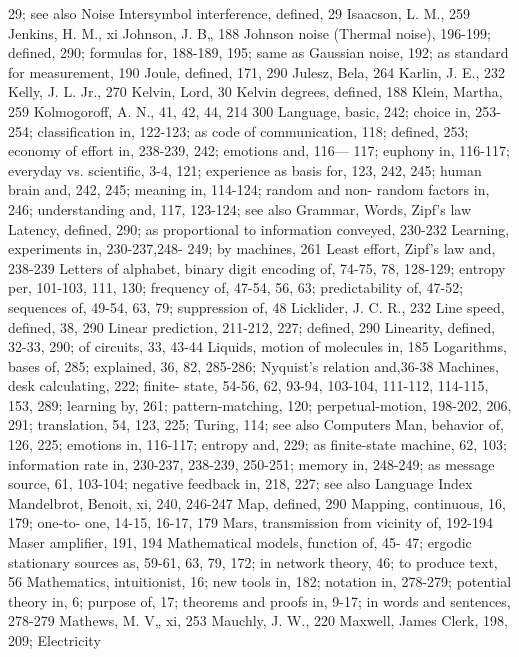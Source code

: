 {{{{{{{{{{{{{{{29; see also Noise
Intersymbol interference, defined, 29
Isaacson, L. M., 259
Jenkins, H. M., xi
Johnson, J. B„ 188
Johnson noise (Thermal noise), 196-199;
defined, 290; formulas for, 188-189,
195; same as Gaussian noise, 192;
as standard for measurement, 190
Joule, defined, 171, 290
Julesz, Bela, 264
Karlin, J. E., 232
Kelly, J. L. Jr., 270
Kelvin, Lord, 30
Kelvin degrees, defined, 188
Klein, Martha, 259
Kolmogoroff, A. N., 41, 42, 44, 214
300
Language, basic, 242; choice in, 253-
254; classification in, 122-123; as
code of communication, 118; defined,
253; economy of effort in,
238-239, 242; emotions and, 116—
117; euphony in, 116-117; everyday
vs. scientific, 3-4, 121; experience
as basis for, 123, 242, 245;
human brain and, 242, 245; meaning
in, 114-124; random and non-
random factors in, 246; understanding
and, 117, 123-124; see also
Grammar, Words, Zipf’s law
Latency, defined, 290; as proportional
to information conveyed, 230-232
Learning, experiments in, 230-237,248-
249; by machines, 261
Least effort, Zipf’s law and, 238-239
Letters of alphabet, binary digit encoding
of, 74-75, 78, 128-129; entropy
per, 101-103, 111, 130; frequency
of, 47-54, 56, 63; predictability of,
47-52; sequences of, 49-54, 63, 79;
suppression of, 48
Licklider, J. C. R., 232
Line speed, defined, 38, 290
Linear prediction, 211-212, 227; defined,
290
Linearity, defined, 32-33, 290; of circuits,
33, 43-44
Liquids, motion of molecules in, 185
Logarithms, bases of, 285; explained,
36, 82, 285-286; Nyquist’s relation
and,36-38
Machines, desk calculating, 222; finite-
state, 54-56, 62, 93-94, 103-104,
111-112, 114-115, 153, 289; learning
by, 261; pattern-matching, 120;
perpetual-motion, 198-202, 206,
291; translation, 54, 123, 225; Turing,
114; see also Computers
Man, behavior of, 126, 225; emotions
in, 116-117; entropy and, 229; as
finite-state machine, 62, 103; information
rate in, 230-237, 238-239,
250-251; memory in, 248-249; as
message source, 61, 103-104; negative
feedback in, 218, 227; see also
Language
Index
Mandelbrot, Benoit, xi, 240, 246-247
Map, defined, 290
Mapping, continuous, 16, 179; one-to-
one, 14-15, 16-17, 179
Mars, transmission from vicinity of,
192-194
Maser amplifier, 191, 194
Mathematical models, function of, 45-
47; ergodic stationary sources as,
59-61, 63, 79, 172; in network
theory, 46; to produce text, 56
Mathematics, intuitionist, 16; new tools
in, 182; notation in, 278-279; potential
theory in, 6; purpose of, 17;
theorems and proofs in, 9-17; in
words and sentences, 278-279
Mathews, M. V„ xi, 253
Mauchly, J. W., 220
Maxwell, James Clerk, 198, 209; Electricity
}}}}}}}}}}}}}}}
